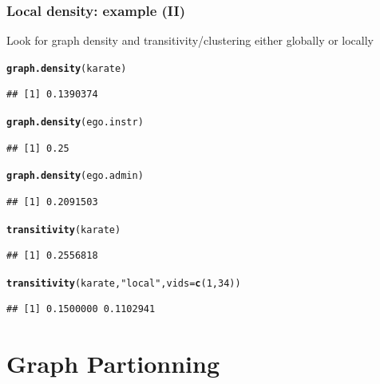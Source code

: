 \documentclass{beamer}\usepackage[]{graphicx}\usepackage[]{color}
\makeatletter
\newcommand{\hlnum}[1]{\textcolor[rgb]{0.686,0.059,0.569}{#1}}%
\newcommand{\hlstr}[1]{\textcolor[rgb]{0.192,0.494,0.8}{#1}}%
\newcommand{\hlstd}[1]{\textcolor[rgb]{0.345,0.345,0.345}{#1}}%
\newcommand{\hlkwc}[1]{\textcolor[rgb]{0.333,0.667,0.333}{#1}}%
\newcommand{\hlkwd}[1]{\textcolor[rgb]{0.737,0.353,0.396}{\textbf{#1}}}%
\newenvironment{kframe}{%
 \def\at@end@of@kframe{}%
 \ifinner\ifhmode%
  \def\at@end@of@kframe{\end{minipage}}%
  \begin{minipage}{\columnwidth}%
 \fi\fi%
 \def\FrameCommand##1{\hskip\@totalleftmargin \hskip-\fboxsep
 \colorbox{shadecolor}{##1}\hskip-\fboxsep
     \hskip-\linewidth \hskip-\@totalleftmargin \hskip\columnwidth}%
 \MakeFramed {\advance\hsize-\width
   \@totalleftmargin\z@ \linewidth\hsize
   \@setminipage}}%
 {\par\unskip\endMakeFramed%
 \at@end@of@kframe}
\newenvironment{knitrout}{}{} %
\makeatother
\begin{document}
\begin{frame}[fragile]
  \frametitle{Local density: example (II)}

Look for graph density and transitivity/clustering either globally or locally
\begin{knitrout}\scriptsize
{}\color{fgcolor}\begin{kframe}
\begin{alltt}
\hlkwd{graph.density}\hlstd{(karate)}
\end{alltt}
\begin{verbatim}
## [1] 0.1390374
\end{verbatim}
\begin{alltt}
\hlkwd{graph.density}\hlstd{(ego.instr)}
\end{alltt}
\begin{verbatim}
## [1] 0.25
\end{verbatim}
\begin{alltt}
\hlkwd{graph.density}\hlstd{(ego.admin)}
\end{alltt}
\begin{verbatim}
## [1] 0.2091503
\end{verbatim}
\begin{alltt}
\hlkwd{transitivity}\hlstd{(karate)}
\end{alltt}
\begin{verbatim}
## [1] 0.2556818
\end{verbatim}
\begin{alltt}
\hlkwd{transitivity}\hlstd{(karate,} \hlstr{"local"}\hlstd{,} \hlkwc{vids} \hlstd{=} \hlkwd{c}\hlstd{(}\hlnum{1}\hlstd{,}\hlnum{34}\hlstd{))}
\end{alltt}
\begin{verbatim}
## [1] 0.1500000 0.1102941
\end{verbatim}
\end{kframe}
\end{knitrout}

\end{frame}


\section{Graph Partionning}
\end{document}
